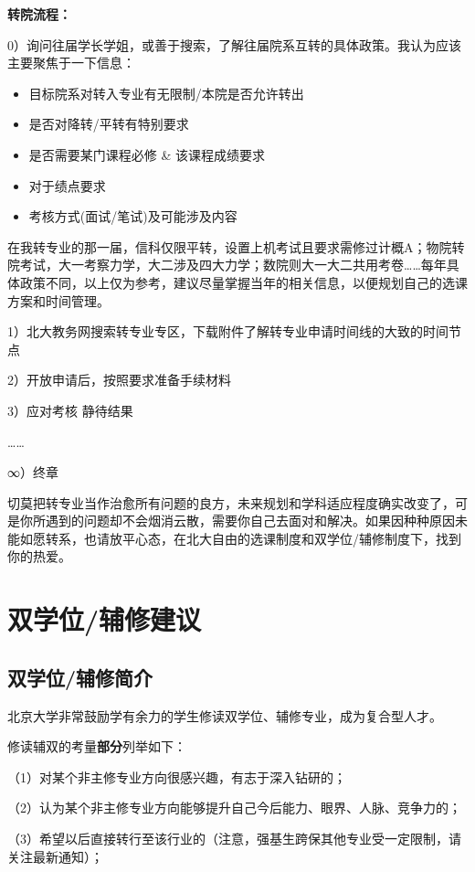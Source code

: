 \documentclass[11pt,oneside]{book}
\begin{document}
\textbf{\textbf{转院流程}}\textbf{\textbf{：}}

0）询问往届学长学姐，或善于搜索，了解往届院系互转的具体政策。我认为应该主要聚焦于一下信息：

\begin{itemize}
    \item 目标院系对转入专业有无限制/本院是否允许转出
    \item 是否对降转/平转有特别要求
    \item 是否需要某门课程必修 \& 该课程成绩要求
    \item 对于绩点要求
    \item 考核方式(面试/笔试)及可能涉及内容
\end{itemize}

在我转专业的那一届，信科仅限平转，设置上机考试且要求需修过计概A；物院转院考试，大一考察力学，大二涉及四大力学；数院则大一大二共用考卷……每年具体政策不同，以上仅为参考，建议尽量掌握当年的相关信息，以便规划自己的选课方案和时间管理。

1）北大教务网搜索转专业专区，下载附件了解转专业申请时间线的大致的时间节点

2）开放申请后，按照要求准备手续材料

3）应对考核 静待结果

……

∞）终章

切莫把转专业当作治愈所有问题的良方，未来规划和学科适应程度确实改变了，可是你所遇到的问题却不会烟消云散，需要你自己去面对和解决。如果因种种原因未能如愿转系，也请放平心态，在北大自由的选课制度和双学位/辅修制度下，找到你的热爱。

\newpage

\section{双学位/辅修建议}
\subsection{双学位/辅修简介}
北京大学非常鼓励学有余力的学生修读双学位、辅修专业，成为复合型人才。

修读辅双的考量\textbf{\textbf{部分}}列举如下：

（1）对某个非主修专业方向很感兴趣，有志于深入钻研的；

（2）认为某个非主修专业方向能够提升自己今后能力、眼界、人脉、竞争力的；

（3）希望以后直接转行至该行业的（注意，强基生跨保其他专业受一定限制，请关注最新通知）；
\end{document}
